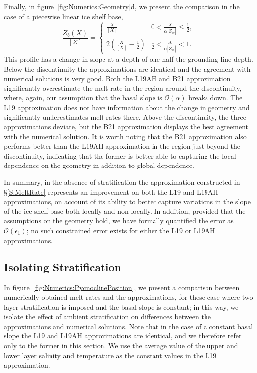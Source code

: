 \documentclass{jfm}
\newcommand{\order}[1]{\mathcal{O}(#1)}
\newcommand{\epsone}{\epsilon_{1}} %
\begin{document}
Finally, in figure~\ref{fig:Numerics:Geometry}d, we present the comparison in the case of a piecewise linear ice shelf base,
\begin{equation}\label{E:Numerics:PiecewiseGeometry}
\frac{Z_b(X)}{\left[Z\right]} = \begin{cases}
  \frac{X}{\left[X\right]}  & 0 <   \frac{X}{\alpha |Z_{gl}|} \leq   \frac{1}{2},\\
   2 \left(\frac{X}{\left[X\right]} -\frac{1}{2}\right)  &  \frac{1}{2} <   \frac{X}{\alpha |Z_{gl}|} <   1.
    \end{cases}
\end{equation}
This profile has a change in slope at a depth of one-half the grounding line depth. Below the discontinuity the approximations are identical and the agreement with numerical solutions is very good. Both the L19AH and B21 approximation significantly overestimate the melt rate in the region around the discontinuity, where, again, our assumption that the basal slope is $\order{\alpha}$ breaks down. The L19 approximation does not have information about the change in geometry and significantly underestimates melt rates there. Above the discontinuity, the three approximations deviate, but the B21 approximation displays the best agreement with the numerical solution. It is worth noting that the B21 approximation also performs better than the L19AH approximation in the region just beyond the discontinuity, indicating that the former is better able to capturing the local dependence on the geometry in addition to global dependence. 

In summary, in the absence of stratification the approximation constructed in \S\ref{S:MeltRate} represents an improvement on both the L19 and L19AH approximations, on account of its ability to better capture variations in the slope of the ice shelf base both locally and non-locally. In addition, provided that the assumptions on the geometry hold, we have formally quantified the error as $\order{\epsone}$; no such constrained error exists for either the L19 or L19AH approximations. 

\subsection{Isolating Stratification}
In figure~\ref{fig:Numerics:PycnoclinePosition}, we present a comparison between numerically obtained melt rates and the approximations, for these case where two layer stratification is imposed and the basal slope is constant; in this way, we isolate the effect of ambient stratification on differences between the approximations and numerical solutions. Note that in the case of a constant basal slope the L19 and L19AH approximations are identical, and we therefore refer only to the former in this section. We use the average value of the upper and lower layer salinity and temperature as the constant values in the L19 approximation.
\end{document}
